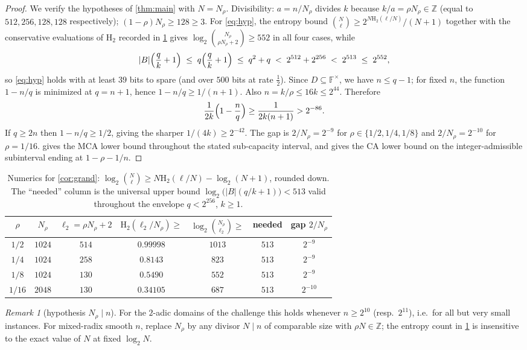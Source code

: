 \documentclass[11pt]{article}
\theoremstyle{definition}
\theoremstyle{remark}
\newtheorem{remark}[theorem]{Remark}
\newcommand{\F}{\mathbb{F}}
\newcommand{\B}{B}
\newcommand{\Hb}{\mathrm{H}_2}
\begin{document}
\begin{proof}
We verify the hypotheses of \cref{thm:main} with $N=N_\rho$. Divisibility: $a=n/N_\rho$ divides $k$ because $k/a=\rho N_\rho\in\mathbb Z$ (equal to $512,256,128,128$ respectively); $(1-\rho)N_\rho\ge128\ge3$. For \eqref{eq:hyp}, the entropy bound $\binom N\ell\ge2^{N\Hb(\ell/N)}/(N+1)$ together with the conservative evaluations of $\Hb$ recorded in \cref{tab:numerics} gives $\log_2\binom{N_\rho}{\rho N_\rho+2}\ge552$ in all four cases, while
\[
|\B|\Bigl(\frac qk+1\Bigr)\;\le\;q\Bigl(\frac qk+1\Bigr)\;\le\;q^2+q\;<\;2^{512}+2^{256}\;<\;2^{513}\;\le\;2^{552},
\]
so \eqref{eq:hyp} holds with at least $39$ bits to spare (and over $500$ bits at rate $\frac12$). Since $D\subseteq\F^\times$, we have $n\le q-1$; for fixed $n$, the function $1-n/q$ is minimized at $q=n+1$, hence $1-n/q\ge1/(n+1)$. Also $n=k/\rho\le16k\le2^{44}$. Therefore
\[
\frac1{2k}\Bigl(1-\frac nq\Bigr)\ge\frac1{2k(n+1)}>2^{-86}.
\]
If $q\ge2n$ then $1-n/q\ge1/2$, giving the sharper $1/(4k)\ge2^{-42}$. The gap is $2/N_\rho=2^{-9}$ for $\rho\in\{1/2,1/4,1/8\}$ and $2/N_\rho=2^{-10}$ for $\rho=1/16$.  gives the MCA lower bound throughout the stated sub-capacity interval, and gives the CA lower bound on the integer-admissible subinterval ending at $1-\rho-1/n$.
\end{proof}

\begin{table}[ht]
\centering
\begin{tabular}{ccccccc}
\toprule
$\rho$ & $N_\rho$ & $\ell_2=\rho N_\rho+2$ & $\Hb(\ell_2/N_\rho)\ge$ & $\log_2\binom{N_\rho}{\ell_2}\ge$ & needed & gap $2/N_\rho$\\
\midrule
$1/2$  & $1024$ & $514$ & $0.99998$ & $1013$ & $513$ & $2^{-9}$\\
$1/4$  & $1024$ & $258$ & $0.8143$  & $823$  & $513$ & $2^{-9}$\\
$1/8$  & $1024$ & $130$ & $0.5490$  & $552$  & $513$ & $2^{-9}$\\
$1/16$ & $2048$ & $130$ & $0.34105$ & $687$  & $513$ & $2^{-10}$\\
\bottomrule
\end{tabular}
\caption{Numerics for \cref{cor:grand}: $\log_2\binom{N}{\ell}\ge N\Hb(\ell/N)-\log_2(N+1)$, rounded down. The ``needed'' column is the universal upper bound $\log_2\bigl(|\B|(q/k+1)\bigr)<513$ valid throughout the envelope $q<2^{256}$, $k\ge1$.}
\label{tab:numerics}
\end{table}

\begin{remark}[hypothesis $N_\rho\mid n$]
For the $2$-adic domains of the challenge this holds whenever $n\ge2^{10}$ (resp.\ $2^{11}$), i.e.\ for all but very small instances. For mixed-radix smooth $n$, replace $N_\rho$ by any divisor $N\mid n$ of comparable size with $\rho N\in\mathbb Z$; the entropy count in \cref{tab:numerics} is insensitive to the exact value of $N$ at fixed $\log_2 N$.
\end{remark}
\end{document}
